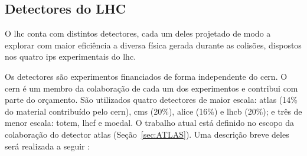 \subsection{Detectores do LHC}
\label{ssec:lhc_detectores}

O \gls{lhc} conta com distintos detectores, 
cada um deles projetado de modo a explorar com maior eficiência 
a diversa física gerada durante as colisões, dispostos nos quatro \glspl{ip}
experimentais do \gls{lhc}.


Os detectores são experimentos financiados de forma independente do \gls{cern}. O
\gls{cern} é um membro da colaboração de cada um dos experimentos e contribui com parte do
orçamento. São utilizados quatro detectores de maior
escala: \acrshort{atlas} (14\% do material contribuído pelo \gls{cern}),
\acrshort{cms} (20\%), \acrshort{alice} (16\%) e \acrshort{lhcb} (20\%); e três de menor escala:
\acrshort{totem}, \acrshort{lhcf} e \acrshort{moedal}. O trabalho atual está definido no
escopo da colaboração do detector \acrshort{atlas} (Seção~\ref{sec:ATLAS}). 
Uma descrição breve deles será realizada a seguir
\cite{lecture_slides_1,lecture_slides_2,closerLook}: 
